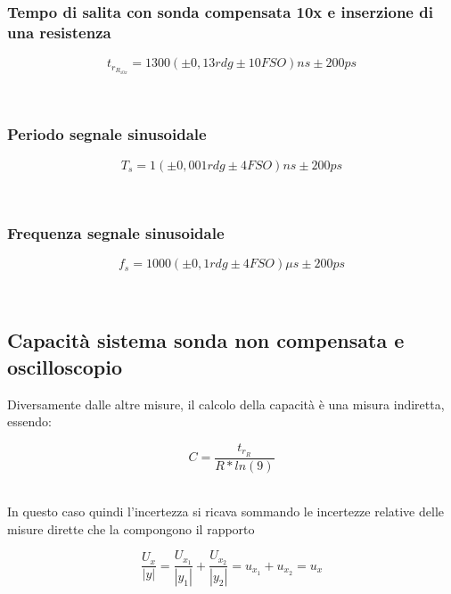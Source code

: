 \documentclass[a4paper]{article}
\begin{document}
\subsubsection{Tempo di salita con sonda compensata 10x e inserzione di una resistenza}
\begin{Large}
	\begin{equation}
  		{t_{r_{R_{10x}}}}= 1300(\pm 0,13 rdg \pm10 FSO)ns \pm200ps %
	\end{equation}
\end{Large}\\

\subsubsection{Periodo segnale sinusoidale}
\begin{Large}
	\begin{equation}
  		{T_s}= 1(\pm 0,001 rdg \pm4 FSO)ns \pm200ps
	\end{equation}
\end{Large}\\

\subsubsection{Frequenza segnale sinusoidale}
\begin{Large}
	\begin{equation}
  		{f_s}= 1000(\pm 0,1 rdg \pm4 FSO)\mu s \pm200ps %
	\end{equation}
\end{Large}\\

\subsection{Capacità sistema sonda non compensata e oscilloscopio}
Diversamente dalle altre misure, il calcolo della capacità è una misura indiretta, essendo: 
\begin{Large}
	\begin{equation}
  		C= \frac{t_{r_R}}{R*ln(9)}
	\end{equation}
\end{Large}\\

In questo caso quindi l'incertezza si ricava sommando le incertezze relative delle misure dirette che la compongono il rapporto 
\begin{Large}
	\begin{equation}
  		\frac{U_x}{|y|}= \frac{U_{x_1}}{|y_1|}+\frac{U_{x_2}}{|y_2|}=u_{x_1}+u_{x_2}=u_x
	\end{equation}
\end{Large}\\
\end{document}
